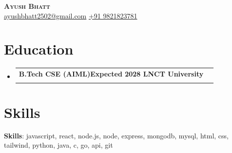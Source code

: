 \documentclass[letterpaper,11pt]{article}
\makeatletter
\newcommand{\resumeSubheading}[4]{
  \vspace{-2pt}\item
    \begin{tabular*}{0.97\textwidth}[t]{l@{\extracolsep{\fill}}r}
      \textbf{#1} & #2 \\
      \textit{\small#3} & \textit{\small #4} \\
    \end{tabular*}\vspace{-7pt}
}
\newcommand{\resumeSubHeadingListStart}{\begin{itemize}[leftmargin=0.15in, label={}]}
\newcommand{\resumeSubHeadingListEnd}{\end{itemize}}
\makeatother
\begin{document}
\begin{center}
    \textbf{\Huge \scshape Ayush Bhatt} \\ \vspace{8pt}
    \small 
    \href{mailto:ayushbhatt2502@gmail.com}{\color{black}ayushbhatt2502@gmail.com} \hspace{5px}
    \href{tel:+91 9821823781}{\color{black}+91 9821823781}
\end{center}

\vspace{-8pt}

\section{Education}
  \resumeSubHeadingListStart
    \resumeSubheading
    {B.Tech CSE (AIML)Expected 2028
LNCT University}{}
    {}{}
  \resumeSubHeadingListEnd

\section{Skills}
 \begin{itemize}[leftmargin=0.15in, label={}]
    \small{\item{
     \textbf{Skills}{: javascript, react, node.js, node, express, mongodb, mysql, html, css, tailwind, python, java, c, go, api, git}  %
    }}
 \end{itemize}
\end{document}
